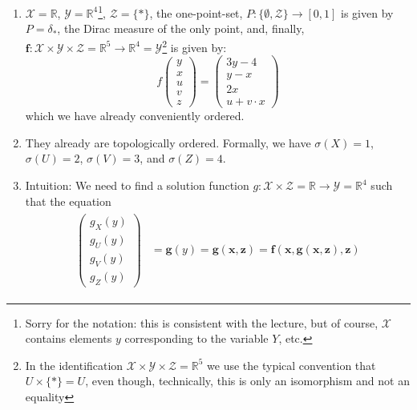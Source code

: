   \begin{gradedsolution}
    \begin{enumerate}
      \item $\boldsymbol{\mathcal{X}} = \mathbb{R}$, $\boldsymbol{\mathcal{Y}} = \mathbb{R}^{4}$\footnote{Sorry for the notation: this is consistent with the lecture, but of course, $\mathbf{\mathcal{X}}$ contains elements $y$ corresponding to the variable $Y$, etc.}, $\boldsymbol{\mathcal{Z}} = \{*\}$, the one-point-set, $P: \{\emptyset, \boldsymbol{\mathcal{Z}}\} \to [0,1]$ is given by $P = \delta_{*}$, the Dirac measure of the only point, and, finally, $\boldsymbol{f}: \boldsymbol{\mathcal{X}} \times \boldsymbol{\mathcal{Y}} \times \boldsymbol{\mathcal{Z}} = \mathbb{R}^{5} \to \mathbb{R}^{4} = \boldsymbol{\mathcal{Y}}$\footnote{In the identification $\boldsymbol{\mathcal{X}} \times \boldsymbol{\mathcal{Y}} \times \boldsymbol{\mathcal{Z}} = \mathbb{R}^{5}$ we use the typical convention that $U \times \{*\} = U$, even though, technically, this is only an isomorphism and not an equality} is given by:
	\begin{equation}
	  f \begin{pmatrix} y \\ x \\ u \\ v \\ z\end{pmatrix}
	  = \begin{pmatrix} 3y - 4 \\ y - x \\ 2x \\ u + v \cdot x\end{pmatrix}
	  \label{eq:functional_equation}
	\end{equation}
	which we have already conveniently ordered. 
      \item They already are topologically ordered. Formally, we have $\sigma(X) = 1$, $\sigma(U) = 2$, $\sigma(V) = 3$, and $\sigma(Z) = 4$. 
      \item Intuition: We need to find a solution function $g: \boldsymbol{\mathcal{X}} \times \boldsymbol{\mathcal{Z}} = \mathbb{R} \to \boldsymbol{\mathcal{Y}} = \mathbb{R}^{4}$ such that the equation 
	\begin{align}
	  \begin{split}
	  \begin{pmatrix} g_X(y) \\ g_U(y) \\ g_V(y) \\ g_Z(y)\end{pmatrix} & = \boldsymbol{g}(y)  = \boldsymbol{g}(\boldsymbol{x}, \boldsymbol{z}) = \boldsymbol{f}(\boldsymbol{x}, \boldsymbol{g}(\boldsymbol{x}, \boldsymbol{z}), \boldsymbol{z}) 

\end{split}
\end{align}
\end{enumerate}
\end{gradedsolution}
